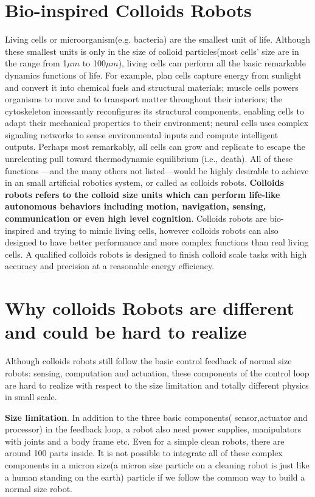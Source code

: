 \section{Bio-inspired Colloids Robots}
Living cells or microorganism(e.g. bacteria) are the smallest unit of life. Although these smallest units is only in the size of colloid particles(most cells' size are in the range from 1$\mu m$ to 100$\mu m$), living cells can perform all the basic remarkable dynamics functions of life. For example, plan cells capture energy from sunlight and convert it into chemical fuels and structural materials; muscle cells powers organisms to move and to transport matter throughout their interiors; the cytoskeleton incessantly reconfigures its structural components, enabling cells to adapt their mechanical properties to their environment; neural cells uses complex signaling networks to sense environmental inputs and compute intelligent outputs. Perhaps most remarkably, all cells can grow and replicate to escape the unrelenting pull toward thermodynamic equilibrium (i.e., death).  All of these functions ---and the many others not listed---would be highly desirable to achieve in an small artificial robotics system, or called as colloids robots. \textbf{Colloids robots refers to the colloid size units which can perform life-like autonomous behaviors including motion, navigation, sensing, communication or even high level cognition}.  Colloids robots are bio-inspired and trying to mimic living cells, however colloids robots can also designed to have better performance and more complex functions than real living cells. A qualified colloids robots is designed to finish colloid scale tasks with high accuracy and precision at a reasonable energy efficiency.
\section{Why colloids Robots are different and could be hard to realize}
Although colloids robots still follow the basic control feedback of normal size robots: sensing, computation and actuation, these components of the control loop are hard to realize with respect to the size limitation and totally different physics in small scale. 

\textbf{Size limitation}. In addition to the three basic components( sensor,actuator and processor) in the feedback loop, a robot also need power supplies, manipulators with joints and a body frame etc. Even for a simple clean robots, there are around 100 parts inside. It is not possible to integrate all of these complex components in a micron size(a micron size particle on a cleaning robot is just like a human standing on the earth) particle if we follow the common way to build a normal size robot. 


